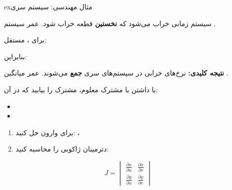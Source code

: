 \begin{PSbox}[unbreakable]{ex}{مثال مهندسی: سیستم سری}

سیستم زمانی خراب می‌شود که \textbf{نخستین} قطعه خراب شود. عمر سیستم .

برای ،  مستقل:\PSbr{}

بنابراین: 

\textbf{نتیجه کلیدی:} نرخ‌های خرابی در سیستم‌های سری \textbf{جمع} می‌شوند. عمر میانگین .

\end{PSbox}



با داشتن  با  مشترک معلوم،  مشترک  را بیابید که در آن:

\begin{itemize}
\tightlist
\item
\item
\end{itemize}


\begin{enumerate}
\def\labelenumi{\arabic{enumi}.}
\tightlist
\item
  برای وارون حل کنید: ، 
\item
  دترمینان ژاکوبی را محاسبه کنید:
\end{enumerate}

\[J = \begin{vmatrix} \frac{\partial x}{\partial u} & \frac{\partial x}{\partial v} \\ \frac{\partial y}{\partial u} & \frac{\partial y}{\partial v} \end{vmatrix}\]

